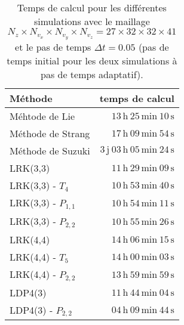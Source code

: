 \begin{table}[h]
  \centering
  \begin{tabular}{l|r}
    Méthode & temps de calcul \\
    \hline
    Méhtode de Lie       &                $13\,\textrm{h}\ 25\,\textrm{min}\ 10\,\textrm{s}$ \\
    Méthode de Strang    &                $17\,\textrm{h}\ 09\,\textrm{min}\ 54\,\textrm{s}$ \\
    Méthode de Suzuki    & $3\,\textrm{j}\ 03\,\textrm{h}\ 05\,\textrm{min}\ 24\,\textrm{s}$ \\
    \hline
    LRK(3,3)             &                $11\,\textrm{h}\ 29\,\textrm{min}\ 09\,\textrm{s}$ \\
    LRK(3,3) - $T_4$     &                $10\,\textrm{h}\ 53\,\textrm{min}\ 40\,\textrm{s}$ \\
    LRK(3,3) - $P_{1,1}$ &                $10\,\textrm{h}\ 54\,\textrm{min}\ 11\,\textrm{s}$ \\
    LRK(3,3) - $P_{2,2}$ &                $10\,\textrm{h}\ 55\,\textrm{min}\ 26\,\textrm{s}$ \\
    \hline
    LRK(4,4)             &                $14\,\textrm{h}\ 06\,\textrm{min}\ 15\,\textrm{s}$ \\
    LRK(4,4) - $T_5$     &                $14\,\textrm{h}\ 00\,\textrm{min}\ 03\,\textrm{s}$ \\
    LRK(4,4) - $P_{2,2}$ &                $13\,\textrm{h}\ 59\,\textrm{min}\ 59\,\textrm{s}$ \\
    \hline
    LDP4(3)              &                $11\,\textrm{h}\ 44\,\textrm{min}\ 04\,\textrm{s}$ \\
    LDP4(3) - $P_{2,2}$  &                $04\,\textrm{h}\ 09\,\textrm{min}\ 44\,\textrm{s}$ \\
  \end{tabular}
  \caption{Temps de calcul pour les différentes simulations avec le maillage $N_z \times N_{v_x} \times N_{v_y} \times N_{v_z}=27\times32\times32\times41$ et le pas de temps $\Delta t = 0.05$ (pas de temps initial pour les deux simulations à pas de temps adaptatif).}
  \label{tab:3:computing:time}
\end{table}

